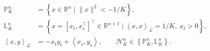 \documentclass[border=8pt]{standalone}
\begin{document}
$\displaystyle
\begin{aligned}
\mathbb{P}^{n}_{K}
&=\left\{x\in\mathbb{R}^{n}\mid\lVert x\rVert^{2}<-1/K\right\},\\[4pt]
\mathbb{L}^{n}_{K}
&=\left\{x=\left[x_t,x_s^{\top}\right]^{\top}\in\mathbb{R}^{n+1}
\mid\left\langle x,x\right\rangle_{\mathcal{L}}=1/K,\ x_t>0\right\},\\[4pt]
\left\langle x,y\right\rangle_{\mathcal{L}}
&=-x_ty_t+\left\langle x_s,y_s\right\rangle,
\qquad
\mathcal{H}^{n}_{K}\in\left\{\mathbb{P}^{n}_{K},\mathbb{L}^{n}_{K}\right\}.
\end{aligned}
$
\end{document}
